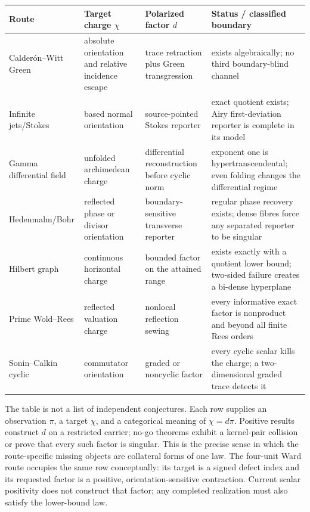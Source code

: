 \documentclass[11pt]{article}
\theoremstyle{definition}
\theoremstyle{remark}
\begin{document}
\begin{center}
\small
\begin{tabularx}{\textwidth}{@{}>{\raggedright\arraybackslash}p{}
  >{\raggedright\arraybackslash}p{}
  >{\raggedright\arraybackslash}X
  >{\raggedright\arraybackslash}p{}@{}}
\toprule
Route & Target charge \(\chi\) & Polarized factor \(d\) & Status / classified boundary \\
\midrule
Calder\'on--Witt Green & absolute orientation and relative incidence escape
  & trace retraction plus Green transgression & exists algebraically; no third boundary-blind channel \\[6pt]

Infinite jets/Stokes & based normal orientation
  & source-pointed Stokes reporter & exact quotient exists; Airy first-deviation reporter is complete in its model \\[6pt]

Gamma differential field & unfolded archimedean charge
  & differential reconstruction before cyclic norm & exponent one is hypertranscendental; even folding changes the differential regime \\[6pt]

Hedenmalm/Bohr & reflected phase or divisor orientation
  & boundary-sensitive transverse reporter & regular phase recovery exists; dense fibres force any separated reporter to be singular \\[6pt]

Hilbert graph & continuous horizontal charge
  & bounded factor on the attained range & exists exactly with a quotient lower bound; two-sided failure creates a bi-dense hyperplane \\[6pt]

Prime Wold--Rees & reflected valuation charge
  & nonlocal reflection sewing & every informative exact factor is nonproduct and beyond all finite Rees orders \\[6pt]

Sonin--Calkin cyclic & commutator orientation
  & graded or noncyclic factor & every cyclic scalar kills the charge; a two-dimensional graded trace detects it \\
\bottomrule
\end{tabularx}
\end{center}

The table is not a list of independent conjectures.  Each row supplies an
observation \(\pi\), a target \(\chi\), and a categorical meaning of
\(\chi=d\pi\).  Positive results construct \(d\) on a restricted carrier;
no-go theorems exhibit a kernel-pair collision or prove that every such
factor is singular.  This is the precise sense in which the route-specific
missing objects are collateral forms of one law.
The four-unit Ward route occupies the same row conceptually: its target is a
signed defect index and its requested factor is a positive,
orientation-sensitive contraction.  Current scalar positivity does not
construct that factor; any completed realization must also satisfy the
lower-bound law.
\end{document}
